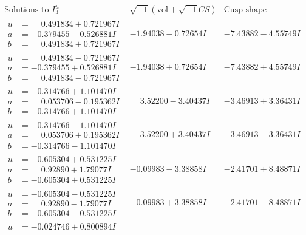 \documentclass[1p]{elsarticle_modified}
\theoremstyle{definition}
\newcommand{\I}{\sqrt{-1}}
\begin{document}
$$\begin{array}{c|c|c}  
\text{Solutions to }I^u_{3}& \I (\text{vol} + \sqrt{-1}CS) & \text{Cusp shape}\\
 \hline 
\begin{aligned}
u &= \phantom{-}0.491834 + 0.721967 I \\
a &= -0.379455 - 0.526881 I \\
b &= \phantom{-}0.491834 + 0.721967 I\end{aligned}
 & -1.94038 - 0.72654 I & -7.43882 - 4.55749 I \\ \hline\begin{aligned}
u &= \phantom{-}0.491834 - 0.721967 I \\
a &= -0.379455 + 0.526881 I \\
b &= \phantom{-}0.491834 - 0.721967 I\end{aligned}
 & -1.94038 + 0.72654 I & -7.43882 + 4.55749 I \\ \hline\begin{aligned}
u &= -0.314766 + 1.101470 I \\
a &= \phantom{-}0.053706 - 0.195362 I \\
b &= -0.314766 + 1.101470 I\end{aligned}
 & \phantom{-}3.52200 - 3.40437 I & -3.46913 + 3.36431 I \\ \hline\begin{aligned}
u &= -0.314766 - 1.101470 I \\
a &= \phantom{-}0.053706 + 0.195362 I \\
b &= -0.314766 - 1.101470 I\end{aligned}
 & \phantom{-}3.52200 + 3.40437 I & -3.46913 - 3.36431 I \\ \hline\begin{aligned}
u &= -0.605304 + 0.531225 I \\
a &= \phantom{-}0.92890 + 1.79077 I \\
b &= -0.605304 + 0.531225 I\end{aligned}
 & -0.09983 - 3.38858 I & -2.41701 + 8.48871 I \\ \hline\begin{aligned}
u &= -0.605304 - 0.531225 I \\
a &= \phantom{-}0.92890 - 1.79077 I \\
b &= -0.605304 - 0.531225 I\end{aligned}
 & -0.09983 + 3.38858 I & -2.41701 - 8.48871 I \\ \hline\begin{aligned}
u &= -0.024746 + 0.800894 I \\

\end{aligned}
\end{array}$$
\end{document}
